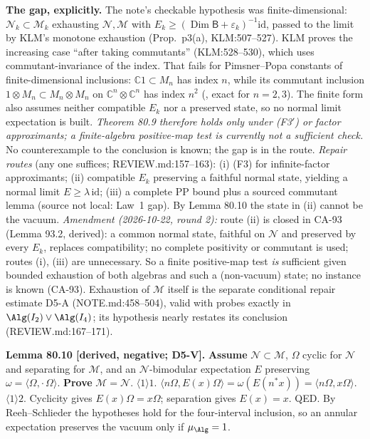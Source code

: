 \textbf{The gap, explicitly.}  The note's checkable hypothesis was finite-dimensional:
\(\mathcal N_k\subset\mathcal M_k\) exhausting \(\mathcal N,\mathcal M\) with
\(E_k\ge(\operatorname{Dim}\mathsf B+\varepsilon_k)^{-1}\mathrm{id}\), passed to the limit by KLM's monotone
exhaustion (Prop.\ p3(a), KLM:507--527).  KLM proves the increasing case ``after taking commutants''
(KLM:528--530), which uses commutant-invariance of the index.  That fails for Pimsner--Popa constants of
finite-dimensional inclusions: \(\mathbb C1\subset M_n\) has index \(n\), while its commutant inclusion
\(1\otimes M_n\subset M_n\otimes M_n\) on \(\mathbb C^n\otimes\mathbb C^n\) has index \(n^2\)
(, exact for \(n=2,3\)).  The finite form also assumes neither
compatible \(E_k\) nor a preserved state, so no normal limit expectation is built.  \emph{Theorem 80.9
therefore holds only under (F3\('\)) or factor approximants; a finite-algebra positive-map test is
currently not a sufficient check.}  No counterexample to the conclusion is known; the gap is in the route.
\emph{Repair routes} (any one suffices; REVIEW.md:157--163): (i) (F3) for infinite-factor approximants;
(ii) compatible \(E_k\) preserving a faithful normal state, yielding a normal limit \(E\ge\lambda\,\mathrm{id}\);
(iii) a complete PP bound plus a sourced commutant lemma (source not local: Law~1 gap).  By Lemma 80.10 the
state in (ii) cannot be the vacuum.  \emph{Amendment (2026-10-22, round 2):} route (ii) is
closed in CA-93 (Lemma 93.2, derived): a common normal state, faithful on \(\mathcal N\) and preserved by every \(E_k\), replaces
compatibility; no complete positivity or commutant is used; routes (i), (iii) are unnecessary.  So a finite positive-map test
\emph{is} sufficient given bounded exhaustion of both algebras and such a (non-vacuum) state; no instance is known (CA-93).  Exhaustion of \(\mathcal M\) itself is the separate
conditional repair estimate D5-A (NOTE.md:458--504), valid with probes exactly in
\(\Alg(I_2)\vee\Alg(I_4)\); its hypothesis nearly restates its conclusion (REVIEW.md:167--171).

\textbf{Lemma 80.10 [derived, negative; D5-V].}  \textbf{Assume} \(\mathcal N\subset\mathcal M\),
\(\Omega\) cyclic for \(\mathcal N\) and separating for \(\mathcal M\), and an \(\mathcal N\)-bimodular
expectation \(E\) preserving \(\omega=\langle\Omega,\cdot\,\Omega\rangle\).  \textbf{Prove} \(\mathcal M=\mathcal N\).
\(\langle1\rangle1\). \(\langle n\Omega,E(x)\Omega\rangle=\omega(E(n^*x))=\langle n\Omega,x\Omega\rangle\).
\(\langle1\rangle2\). Cyclicity gives \(E(x)\Omega=x\Omega\); separation gives \(E(x)=x\).  QED.  By Reeh--Schlieder
the hypotheses hold for the four-interval inclusion, so an annular expectation preserves the vacuum only if
\(\mu_\Alg=1\).

